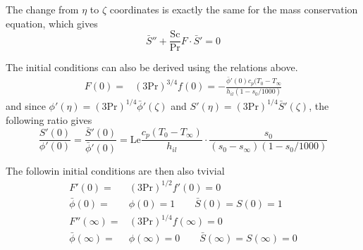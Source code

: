 	The change from $\eta$ to $\zeta$ coordinates is exactly the same for the mass conservation equation, which gives
	\begin{equation*}
	  \bar{S}''+\frac{\text{Sc}}{\text{Pr}}F\cdot \bar{S}'=0
	\end{equation*}

	The initial conditions can also be derived using the relations above.
	\begin{align*}
	  F(0) =& (3\text{Pr})^{3/4} f(0) = -\frac{\bar{\phi}'(0) c_p (T_0-T_\infty}{h_{il}(1-s_0/1000)}
	\end{align*}
	and since $\phi'(\eta)=(3\text{Pr})^{1/4}\bar{\phi}'(\zeta)$ and $S'(\eta)=(3\text{Pr})^{1/4}\bar{S}'(\zeta)$, the following ratio gives
	\begin{equation*}
	  \frac{S'(0)}{\phi'(0)}=\frac{\bar{S}'(0)}{\bar{\phi}'(0)} = \text{Le} \frac{c_p(T_0-T_{\infty})}{h_{il}}\cdot \frac{s_0}{(s_0-s_\infty)(1-s_0/1000)}
	\end{equation*}

	The followin initial conditions are then also tvivial
	\begin{align*}
	  F'(0) =& (3\text{Pr})^{1/2} f'(0) = 0 \\
	  \bar{\phi}(0) =& \phi (0) = 1 \qquad \bar{S}(0) = S (0) = 1 \\
	  F''(\infty) =& (3\text{Pr})^{1/4}f(\infty)=0 \\
	  \bar{\phi}(\infty) =& \phi (\infty) = 0 \qquad \bar{S}(\infty) = S (\infty) = 0 \\
	\end{align*}
	


